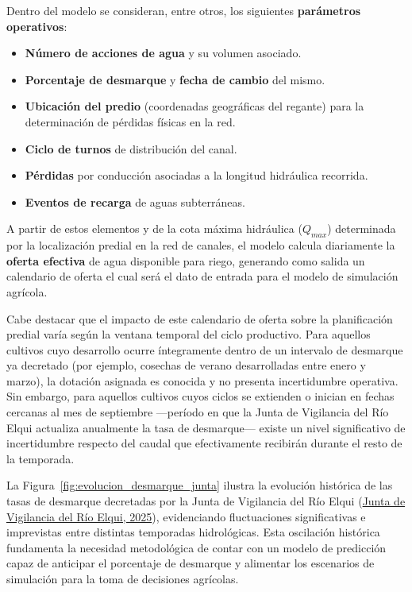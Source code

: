 \documentclass[12pt]{report}
\newcommand{\citeref}[2]{\hyperlink{ref:#1}{#2}}
\begin{document}
\vspace{0.2cm}

Dentro del modelo se consideran, entre otros, los siguientes \textbf{parámetros operativos}:

\begin{itemize}
    \item \textbf{Número de acciones de agua} y su volumen asociado.
    \item \textbf{Porcentaje de desmarque} y \textbf{fecha de cambio} del mismo.
    \item \textbf{Ubicación del predio} (coordenadas geográficas del regante) para la determinación de pérdidas físicas en la red.
    \item \textbf{Ciclo de turnos} de distribución del canal.
    \item \textbf{Pérdidas} por conducción asociadas a la longitud hidráulica recorrida.
    \item \textbf{Eventos de recarga} de aguas subterráneas.
\end{itemize}

A partir de estos elementos y de la cota máxima hidráulica ($Q_{max}$) determinada por la localización predial en la red de canales, el modelo calcula diariamente la \textbf{oferta efectiva} de agua disponible para riego, generando como salida un calendario de oferta el cual será el dato de entrada para el modelo de simulación agrícola.

Cabe destacar que el impacto de este calendario de oferta sobre la planificación predial varía según la ventana temporal del ciclo productivo. Para aquellos cultivos cuyo desarrollo ocurre íntegramente dentro de un intervalo de desmarque ya decretado (por ejemplo, cosechas de verano desarrolladas entre enero y marzo), la dotación asignada es conocida y no presenta incertidumbre operativa. Sin embargo, para aquellos cultivos cuyos ciclos se extienden o inician en fechas cercanas al mes de septiembre —período en que la Junta de Vigilancia del Río Elqui actualiza anualmente la tasa de desmarque— existe un nivel significativo de incertidumbre respecto del caudal que efectivamente recibirán durante el resto de la temporada. 

La Figura~\ref{fig:evolucion_desmarque_junta} ilustra la evolución histórica de las tasas de desmarque decretadas por la Junta de Vigilancia del Río Elqui (\citeref{jvre2025}{Junta de Vigilancia del Río Elqui, 2025}), evidenciando fluctuaciones significativas e imprevistas entre distintas temporadas hidrológicas. Esta oscilación histórica fundamenta la necesidad metodológica de contar con un modelo de predicción capaz de anticipar el porcentaje de desmarque y alimentar los escenarios de simulación para la toma de decisiones agrícolas.
\end{document}

